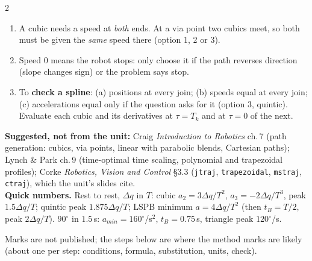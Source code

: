 \begin{multicols}{2}
\begin{recipe}
\begin{enumerate}
\item A cubic needs a speed at \emph{both} ends. At a via point two cubics meet, so both must be given the \emph{same} speed there (option 1, 2 or 3).
\item Speed $0$ means the robot stops: only choose it if the path reverses direction (slope changes sign) or the problem says stop.
\item To \textbf{check a spline}: (a) positions at every join; (b) speeds equal at every join; (c) accelerations equal only if the question asks for it (option 3, quintic). Evaluate each cubic and its derivatives at $\tau=T_k$ and at $\tau=0$ of the next.
\end{enumerate}
\end{recipe}

\nopagebreak[4]
\textbf{Suggested, not from the unit:} Craig \emph{Introduction to Robotics} ch.\,7 (path generation: cubics, via points, linear with parabolic blends, Cartesian paths); Lynch \& Park ch.\,9 (time-optimal time scaling, polynomial and trapezoidal profiles); Corke \emph{Robotics, Vision and Control} \S3.3 (\texttt{jtraj}, \texttt{trapezoidal}, \texttt{mstraj}, \texttt{ctraj}), which the unit's slides cite.\\
\textbf{Quick numbers.} Rest to rest, $\Delta q$ in $T$: cubic $a_2=3\Delta q/T^2$, $a_3=-2\Delta q/T^3$, peak $1.5\Delta q/T$; quintic peak $1.875\Delta q/T$; LSPB minimum $a=4\Delta q/T^2$ (then $t_B=T/2$, peak $2\Delta q/T$). $90^\circ$ in $1.5$\,s: $a_{min}=160^\circ$/s$^2$, $t_B=0.75$\,s, triangle peak $120^\circ$/s. \chk


\nopagebreak[4]
Marks are not published; the steps below are where the method marks are likely (about one per step: conditions, formula, substitution, units, check).


\end{multicols}
